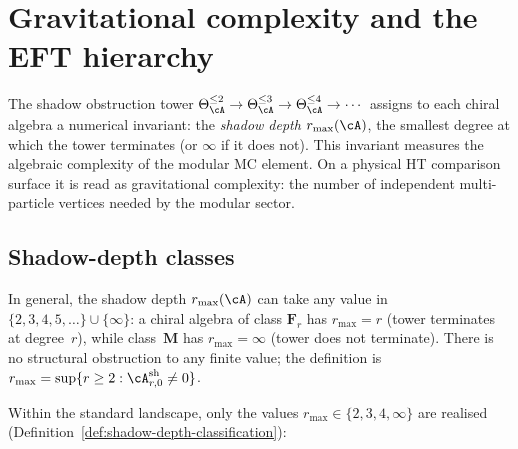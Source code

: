 
\section{Gravitational complexity and the EFT hierarchy}
\label{sec:thqg-intro-gravitational-complexity}

The shadow obstruction tower
$\Theta_\cA^{\le 2} \to \Theta_\cA^{\le 3} \to \Theta_\cA^{\le 4}
\to \cdots$
assigns to each chiral algebra a numerical invariant: the
\emph{shadow depth} $r_{\max}(\cA)$, the smallest degree at which the
tower terminates (or $\infty$ if it does not). This invariant measures
the algebraic complexity of the modular MC element. On a physical
HT comparison surface it is read as gravitational complexity: the
number of independent multi-particle vertices needed by the modular
sector.

\subsection{Shadow-depth classes}
\label{subsec:thqg-intro-four-classes}

In general, the shadow depth $r_{\max}(\cA)$ can take any value in
$\{2,3,4,5,\ldots\}\cup\{\infty\}$: a chiral algebra of class
$\mathbf{F}_r$ has $r_{\max} = r$ (tower terminates at degree~$r$),
while class~$\mathbf{M}$ has $r_{\max} = \infty$ (tower does not
terminate).
There is no structural obstruction to any finite value; the
definition is
$r_{\max}=\sup\{r\ge 2:\cA^{\mathrm{sh}}_{r,0}\ne 0\}$.

Within the standard landscape, only the values
$r_{\max}\in\{2,3,4,\infty\}$ are realised
(Definition~\ref{def:shadow-depth-classification}):

